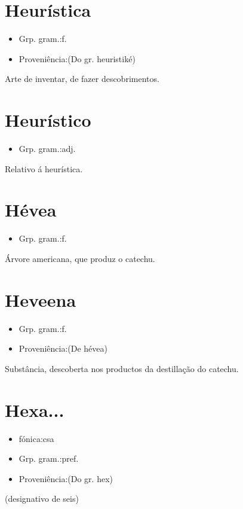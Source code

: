 \documentclass{article}
\begin{document}
\section{Heurística}
\begin{itemize}
\item {Grp. gram.:f.}
\end{itemize}
\begin{itemize}
\item {Proveniência:(Do gr. \textunderscore heuristiké\textunderscore )}
\end{itemize}
Arte de inventar, de fazer descobrimentos.
\section{Heurístico}
\begin{itemize}
\item {Grp. gram.:adj.}
\end{itemize}
Relativo á heurística.
\section{Hévea}
\begin{itemize}
\item {Grp. gram.:f.}
\end{itemize}
Árvore americana, que produz o catechu.
\section{Heveena}
\begin{itemize}
\item {Grp. gram.:f.}
\end{itemize}
\begin{itemize}
\item {Proveniência:(De \textunderscore hévea\textunderscore )}
\end{itemize}
Substância, descoberta nos productos da destillação do catechu.
\section{Hexa...}
\begin{itemize}
\item {fónica:csa}
\end{itemize}
\begin{itemize}
\item {Grp. gram.:pref.}
\end{itemize}
\begin{itemize}
\item {Proveniência:(Do gr. \textunderscore hex\textunderscore )}
\end{itemize}
(designativo de \textunderscore seis\textunderscore )
\end{document}
